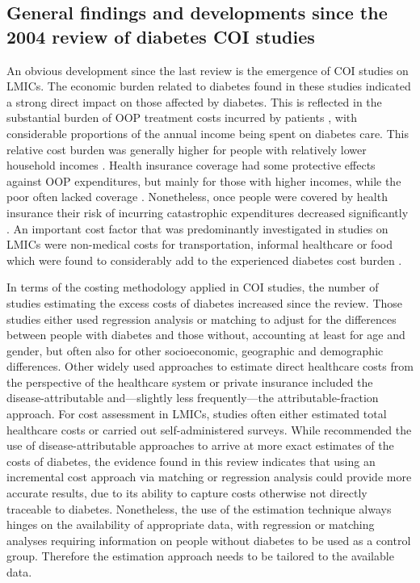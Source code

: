 \subsection{General findings and developments since the 2004 review of diabetes COI studies}
An obvious development since the last review is the emergence of \ac{COI} studies on \acp{LMIC}. The economic burden related to diabetes found in these studies indicated a strong direct impact on those affected by diabetes. This is reflected in the substantial burden of \ac{OOP} treatment costs incurred by patients \parencite{Smith-Spangler2012,Suleiman2006,Arredondo2007,Esteghamati2009,Wang2009b,Ramachandran2007d,Khowaja2007a,Elrayah-Eliadarous2010b,Chatterjee2011c,Tharkar2010a,Wang2010c}, with considerable proportions of the annual income being spent on diabetes care. This relative cost burden was generally higher for people with relatively lower household incomes \parencite{Ramachandran2007d,Khowaja2007a,Tharkar2010a}. Health insurance coverage had some protective effects against \ac{OOP} expenditures, but mainly for those with higher incomes, while the poor often lacked coverage \parencite{Ramachandran2007d,Khowaja2007a,Tharkar2010a}. Nonetheless, once people were covered by health insurance their risk of incurring catastrophic expenditures decreased significantly \parencite{Smith-Spangler2012}. An important cost factor that was predominantly investigated in studies on \acp{LMIC} were non-medical costs for transportation, informal healthcare or food which were found to considerably add to the experienced diabetes cost burden \parencite{Esteghamati2009,Wang2009b,Wang2009f,Chatterjee2011c,Tharkar2010a}.

In terms of the costing methodology applied in \ac{COI} studies, the number of studies estimating the excess costs of diabetes increased since the \textcite{Ettaro2004} review. Those studies either used regression analysis or matching to adjust for the differences between people with diabetes and those without, accounting at least for age and gender, but often also for other socioeconomic, geographic and demographic differences. Other widely used approaches to estimate direct healthcare costs from the perspective of the healthcare system or private insurance included the disease-attributable and---slightly less frequently---the attributable-fraction approach. For cost assessment in \acp{LMIC}, studies often either estimated total healthcare costs or carried out self-administered surveys. While \textcite{Ettaro2004} recommended the use of disease-attributable approaches to arrive at more exact estimates of the costs of diabetes, the evidence found in this review indicates that using an incremental cost approach via matching or regression analysis could provide more accurate results, due to its ability to capture costs otherwise not directly traceable to diabetes. Nonetheless, the use of the estimation technique always hinges on the availability of appropriate data, with regression or matching analyses requiring information on people without diabetes to be used as a control group. Therefore the estimation approach needs to be tailored to the available data. 

